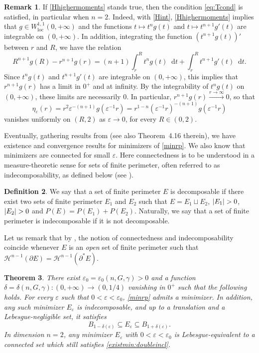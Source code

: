 \documentclass[JEP,XML,SOM,Unicode,published]{cedram}
\numberwithin{equation}{section}
\theoremstyle{plain}
\newtheorem{thm}{Theorem}[section]
\theoremstyle{definition}
\newtheorem{dfn}[thm]{Definition}
\newtheorem{rmk}[thm]{Remark}
\newcommand{\dt}{\mathop{}\mathopen{}\mathrm{d}t}
\newcommand{\calH}{{\mathscr{H}}}
\let\eps\varepsilon
\newcommand{\loc}{{\mathrm{loc}}}
\newcommand{\subsq}{\subseteq}
\DeclarePairedDelimiter{\abs}{\lvert}{\rvert}
\begin{document}
\begin{rmk}\label{rmk:condTHinfty}
If \cref{Hhighermoments} stands true, then the condition \cref{eq:Tcond} is satisfied, in particular
when $n=2$. Indeed, with \cref{Hint}, \cref{Hhighermoments} implies that $g\in
W^{1,1}_\loc(0,+\infty)$ and the functions $t\mapsto t^ng(t)$ and $t\mapsto t^{n+1}g'(t)$ are
integrable on $(0,+\infty)$. In addition, integrating the function $(t^{n+1}g(t))'$ between $r$ and
$R$, we have the relation
\[
R^{n+1}g(R)-r^{n+1}g(r)=(n+1)\int_r^R t^ng(t)\dt+\int_r^R t^{n+1}g'(t)\dt.
\]
Since $t^ng(t)$ and $t^{n+1}g'(t)$ are integrable on $(0,+\infty)$, this implies that $r^{n+1}g(r)$
has a limit in $0^+$ and at infinity.
By the integrability of $t^n g(t)$ on $(0,+\infty)$, these limits are necessarily $0$. In
particular, $r^{n+1}g(r)\xrightarrow{r\to\infty} 0$, so that
\[
\eta_\eps(r)=r^2\eps^{-(n+1)}g(\eps^{-1}r)=r^{1-n}(\eps^{-1}r)^{-(n+1)}g(\eps^{-1}r)
\]
vanishes uniformly on $(R,2)$ as $\eps\to 0$, for every $R\in(0,2)$.
\end{rmk}

Eventually, gathering results from \cite[Th.\,A \& B]{Peg2021} (see also Theorem~4.16
therein), we have existence and convergence results for minimizers of \cref{minrp}.
We also know that minimizers are connected for small $\eps$. Here connectedness is to be understood
in a measure-theoretic sense for sets of finite perimeter, often referred to as indecomposability,
as defined below (see \cite{ACMM2001}).

\begin{dfn}
We say that a set of finite perimeter $E$ is decomposable if there exist two sets of finite
perimeter $E_1$ and $E_2$ such that $E=E_1\sqcup E_2$, $\abs{E_1}>0$, $\abs{E_2}>0$ and
$P(E)=P(E_1)+P(E_2)$. Naturally, we say that a set of finite perimeter is indecomposable if it is
not decomposable.
\end{dfn}

Let us remark that by \cite[Th.\,2]{ACMM2001}, the notion of connectedness and
indecomposability coincide whenever $E$ is an \emph{open} set of finite perimeter such that
$\calH^{n-1}(\partial E)=\calH^{n-1}(\partial^* E)$.

\begin{thm}\label{thm:existmin}
There exist $\eps_0=\eps_0(n,G,\gamma)>0$ and a function
$\delta=\delta(n,G,\gamma):(0,+\infty)\to (0,1/4)$ vanishing in $0^+$ such that the
following holds. For every $\eps$ such that $0<\eps<\eps_0$, \cref{minrp} admits a minimizer. In addition, any such
minimizer $E_\eps$ is indecomposable, and up to a translation and a Lebesgue-negligible set, it
satisfies
\begin{equation}\label{existmin:doubleincl}
B_{1-\delta(\eps)} \subsq E_\eps \subsq B_{1+\delta(\eps)}.
\end{equation}
In dimension $n=2$, any minimizer $E_\eps$ with $0<\eps<\eps_0$ is Lebesgue-equivalent to a
connected set which still satisfies \cref{existmin:doubleincl}.
\end{thm}
\end{document}
